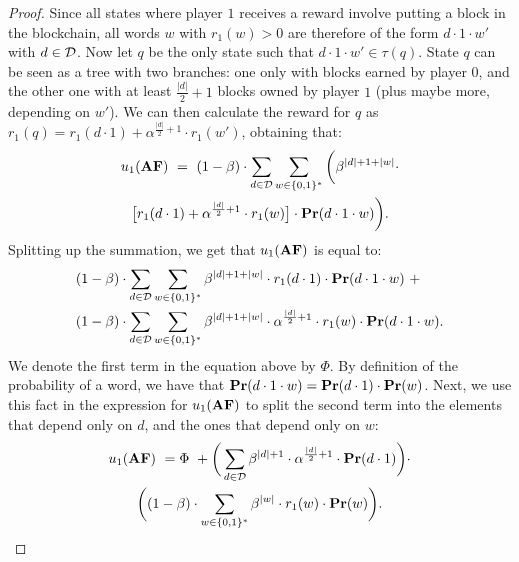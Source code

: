 \begin{proof}
Since all states where player $1$ receives a reward involve putting a block in the blockchain, all words 
$w$ with $r_1(w) > 0$ are therefore of the form $d\cdot 1\cdot w'$ with $d \in \mathcal{D}$. Now let $q$ be the only state such that  $d\cdot 1\cdot w' \in \tau(q)$.
State $q$ can be seen as a tree with two branches: one only with blocks earned by player $0$, and the other one 
with at least ${\frac{|d|}{2}+1}$ blocks owned by player $1$ (plus maybe more, depending on $w'$). 
We can then calculate the reward for $q$ as $r_1(q) = r_1(d \cdot 1) + \alpha^{\frac{|d|}{2}+1}\cdot r_1(w')$, obtaining that:
\begin{multline*}
u_1(\text{\rm {\bf AF}}) \ = \ (1-\beta) \cdot \sum_{d\in \mathcal{D}}  \sum_{w\in \{0,1\}^*} \bigg(\beta^{|d|+1+|w|}\cdot \\
 \big[r_1(d\cdot 1) + \alpha^{\frac{|d|}{2}+1}\cdot r_1(w)\big] \cdot \mathbf{Pr}(d\cdot 1 \cdot w)\bigg).
\end{multline*}
%
Splitting up the summation, we get that $ u_1(\text{\rm {\bf AF}})$ is equal to:
\begin{align*}
&(1-\beta) \cdot \sum_{d\in \mathcal{D}}  \sum_{w\in \{0,1\}^*}\beta^{|d|+1+|w|}\cdot r_1(d\cdot 1) \cdot \mathbf{Pr}(d\cdot 1\cdot w) \ +\\
 & (1-\beta) \cdot \sum_{d\in \mathcal{D}}  \sum_{w\in \{0,1\}^*}\beta^{|d|+1+|w|}\cdot  \alpha^{\frac{|d|}{2}+1}\cdot r_1(w) \cdot \mathbf{Pr}(d\cdot 1 \cdot w).
\end{align*}
%
We denote the first term in the equation above by $\Phi$. 
By definition of the probability of a word, we have that $\mathbf{Pr}(d\cdot 1\cdot w) = \mathbf{Pr}(d\cdot 1)\cdot \mathbf{Pr}(w)$. 
Next, we use this fact in the expression for $u_1(\text{\rm {\bf AF}})$ to split the second term into the elements that depend only on $d$, and the ones that depend only on $w$:
%
\begin{multline*}
 u_1(\text{\rm {\bf AF}}) \ = \Phi  \ +  \bigg(\sum_{d\in \mathcal{D}} \beta^{|d|+1}\cdot  \alpha^{\frac{|d|}{2}+1}\cdot \mathbf{Pr}(d\cdot 1)\bigg) \cdot \\
 \bigg((1-\beta) \cdot \sum_{w\in \{0,1\}^*} \beta^{|w|} \cdot r_1(w)  \cdot \mathbf{Pr}(w)\bigg).
\end{multline*}

\end{proof}
